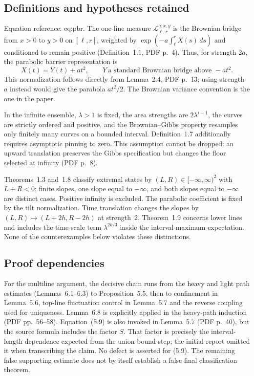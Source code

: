 \documentclass[10pt]{article}
\begin{document}
\subsection*{Definitions and hypotheses retained}
Equation reference: eq:pbr. The one-line measure \(\mathcal L^{a;x,y}_{\ell,r}\) is the Brownian bridge from \(x>0\) to \(y>0\) on \([\ell,r]\), weighted by \(\exp(-a\int_\ell^r X(s)\,ds)\) and conditioned to remain positive (Definition 1.1, PDF p. 4). Thus, for strength \(2a\), the parabolic barrier representation is \[
 X(t)=Y(t)+at^2,\qquad
 Y\ \text{a standard Brownian bridge above }-at^2.\] This normalization follows directly from Lemma 2.4, PDF p. 13; using strength \(a\) instead would give the parabola \(at^2/2\). The Brownian variance convention is the one in the paper.\par
In the infinite ensemble, \(\lambda>1\) is fixed, the area strengths are \(2\lambda^{i-1}\), the curves are strictly ordered and positive, and the Brownian–Gibbs property resamples only finitely many curves on a bounded interval. Definition 1.7 additionally requires asymptotic pinning to zero. This assumption cannot be dropped: an upward translation preserves the Gibbs specification but changes the floor selected at infinity (PDF p. 8).\par
Theorems 1.3 and 1.8 classify extremal states by \((L,R)\in[-\infty,\infty)^2\) with \(L+R<0\); finite slopes, one slope equal to \(-\infty\), and both slopes equal to \(-\infty\) are distinct cases. Positive infinity is excluded. The parabolic coefficient is fixed by the tilt normalization. Time translation changes the slopes by \((L,R)\mapsto(L+2h,R-2h)\) at strength 2. Theorem 1.9 concerns lower lines and includes the time-scale term \(\lambda^{2k/3}\) inside the interval-maximum expectation. None of the counterexamples below violates these distinctions.\par
\subsection*{Proof dependencies}
For the multiline argument, the decisive chain runs from the heavy and light path estimates (Lemmas 6.1–6.3) to Proposition 5.5, then to confinement in Lemma 5.6, top-line fluctuation control in Lemma 5.7 and the reverse coupling used for uniqueness. Lemma 6.8 is explicitly applied in the heavy-path induction (PDF pp. 56–58). Equation (5.9) is also invoked in Lemma 5.7 (PDF p. 40), but the source formula includes the factor \(S\). That factor is precisely the interval-length dependence expected from the union-bound step; the initial report omitted it when transcribing the claim. No defect is asserted for (5.9). The remaining false supporting estimate does not by itself establish a false final classification theorem.\par
\end{document}

